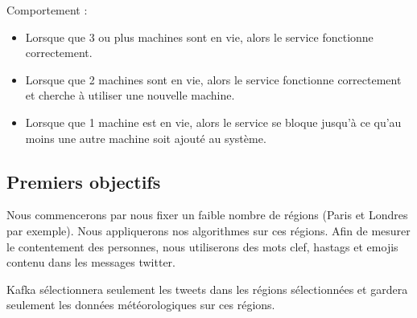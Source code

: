 \documentclass[a4paper,oneside,10pt]{article}
\begin{document}
Comportement : 
\begin{itemize}
	\item Lorsque que 3 ou plus machines sont en vie, alors le service fonctionne correctement.
	\item Lorsque que 2 machines sont en vie, alors le service fonctionne correctement et cherche à utiliser une nouvelle machine.
	\item Lorsque que 1 machine est en vie, alors le service se bloque jusqu'à ce qu'au moins une autre machine soit ajouté au système. 
\end{itemize}


\subsection{Premiers objectifs}


Nous commencerons par nous fixer un faible nombre de régions (Paris et Londres par exemple). Nous appliquerons nos algorithmes sur ces régions. 
Afin de mesurer le contentement des personnes, nous utiliserons des mots clef, hastags et emojis contenu dans les messages twitter. 

Kafka sélectionnera seulement les tweets dans les régions sélectionnées et gardera seulement les données météorologiques sur ces régions. 
\end{document}
